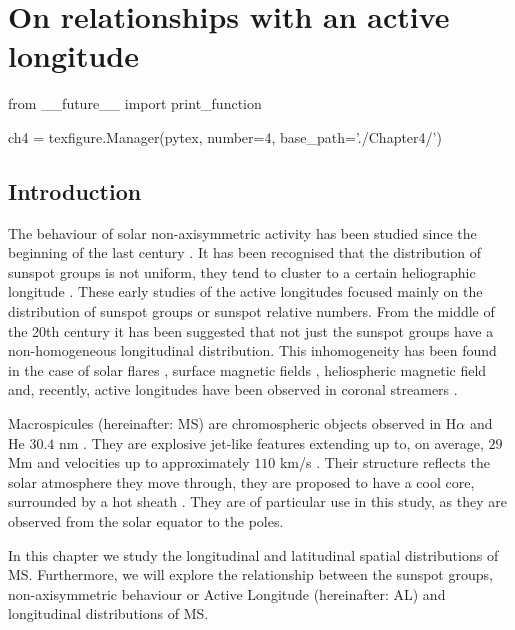 \chapter{On relationships with an active longitude}\label{ch:4}  %

\begin{pycode}[chapter4]
from __future__ import print_function

ch4 = texfigure.Manager(pytex, number=4, base_path='./Chapter4/')
\end{pycode}

\section{Introduction}
The behaviour of solar non-axisymmetric activity has been studied since the beginning of the last century \cite{Chidambara1932}. It has been recognised that the distribution of sunspot groups is not uniform, they tend to cluster to a certain heliographic longitude \cite{Bumba1965,Balthasar1984,Wilkinson1991}. These early studies of the active longitudes focused mainly on the distribution of sunspot groups or sunspot relative numbers. From the middle of the 20th century it has been suggested that not just the sunspot groups have a non-homogeneous longitudinal distribution. This inhomogeneity has been found in the case of solar flares \cite{Zhang2007}, surface magnetic fields \cite{Benevolenskaya1999}, heliospheric magnetic field \cite{Mursula2004} and, recently, active longitudes have been observed in coronal streamers \cite{Jing2011}.

\newpage
Macrospicules (hereinafter: MS) are chromospheric objects observed in H$\alpha$ and He $30.4$ nm \cite{Bohlin1975,Wang1998,Murawski2011,Scullion2010}. They are explosive jet-like features extending up to, on average, $29$ Mm and velocities up to approximately $110$ km/s \cite{Zaqara_Erdelyi2009}. Their structure reflects the solar atmosphere they move through, they are proposed to have a cool core, surrounded by a hot sheath \cite{Parenti2002}. They are of particular use in this study, as they are observed from the solar equator to the poles. 

In this chapter we study the longitudinal and latitudinal spatial distributions of MS. Furthermore, we will explore the relationship between the sunspot groups, non-axisymmetric behaviour or Active Longitude (hereinafter: AL) and longitudinal distributions of MS.

